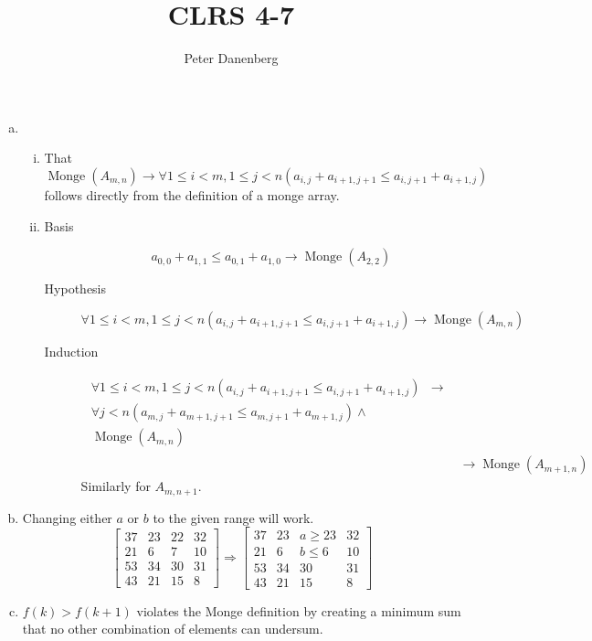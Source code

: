 \documentclass{article}
\title{CLRS 4-7}
\author{Peter Danenberg}
\DeclareMathOperator{\monge}{Monge}
\begin{document}
\maketitle

\begin{enumerate}[a.]
  \item
    \begin{enumerate}[i.]
    \item That $\monge(A_{m,n}) \to \forall 1\leq i< m,1\leq j <
      n(a_{i,j}+a_{i+1,j+1}\leq a_{i,j+1} + a_{i+1,j})$ follows
      directly from the definition of a monge array.
    \item 
      \begin{description}
      \item[Basis]
        \[a_{0,0}+a_{1,1}\leq a_{0,1}+a_{1,0}\to
        \monge(A_{2,2})\]
      \item[Hypothesis]
        \[\forall 1\leq i< m,1\leq j <
        n(a_{i,j}+a_{i+1,j+1}\leq a_{i,j+1} + a_{i+1,j}) \to
        \monge(A_{m,n})\]
      \item[Induction]
        \begin{align}
          \begin{split}
            \forall 1\leq i < m,1\leq j < n(a_{i,j}+a_{i+1,j+1}\leq
            a_{i,j+1} + a_{i+1,j}) &\to\\
            \forall j < n (a_{m,j} + a_{m+1,j+1} \leq a_{m,j+1} + a_{m+1,j}) \wedge\\
            \monge(A_{m,n})
          \end{split}\\
          &\to \monge(A_{m+1,n})
        \end{align}
        Similarly for $A_{m,n+1}$.
      \end{description}
    \end{enumerate}
    \item Changing either $a$ or $b$ to the given range will work.
      \[\begin{bmatrix}
        37&23&22&32\\
        21&6&7&10\\
        53&34&30&31\\
        43&21&15&8
      \end{bmatrix}
      \Rightarrow
      \begin{bmatrix}
        37&23&a\geq23&32\\
        21&6&b\leq6&10\\
        53&34&30&31\\
        43&21&15&8
      \end{bmatrix}\]
    \item $f(k) > f(k+1)$ violates the Monge definition by creating a
      minimum sum that no other combination of elements can undersum.


\end{enumerate}
\end{document}
